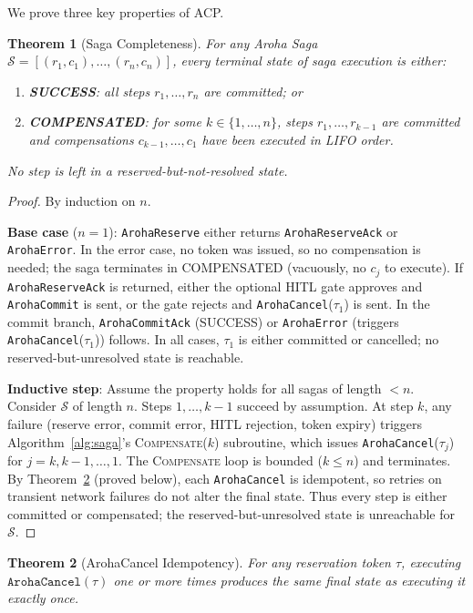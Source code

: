 \documentclass[conference]{IEEEtran}
\newtheorem{theorem}{Theorem}
\newcommand{\Saga}{\mathcal{S}}
\begin{document}
We prove three key properties of ACP.

\begin{theorem}[Saga Completeness]
\label{thm:saga}
For any Aroha Saga $\Saga = [(r_1, c_1), \ldots, (r_n, c_n)]$,
every terminal state of saga execution is either:
\begin{enumerate}
  \item \textbf{SUCCESS}: all steps $r_1, \ldots, r_n$ are committed; or
  \item \textbf{COMPENSATED}: for some $k \in \{1,\ldots,n\}$,
        steps $r_1, \ldots, r_{k-1}$ are committed and compensations
        $c_{k-1}, \ldots, c_1$ have been executed in LIFO order.
\end{enumerate}
No step is left in a \emph{reserved-but-not-resolved} state.
\end{theorem}

\begin{proof}
By induction on $n$.

\textbf{Base case} ($n = 1$): \texttt{ArohaReserve} either returns
\texttt{ArohaReserveAck} or \texttt{ArohaError}.  In the error case,
no token was issued, so no compensation is needed; the saga
terminates in COMPENSATED (vacuously, no $c_j$ to execute).
If \texttt{ArohaReserveAck} is returned, either the optional HITL
gate approves and \texttt{ArohaCommit} is sent, or the gate rejects
and \texttt{ArohaCancel}($\tau_1$) is sent.  In the commit branch,
\texttt{ArohaCommitAck} (SUCCESS) or \texttt{ArohaError}
(triggers \texttt{ArohaCancel}($\tau_1$)) follows.  In all cases,
$\tau_1$ is either committed or cancelled; no reserved-but-unresolved
state is reachable.

\textbf{Inductive step}: Assume the property holds for all sagas of
length $< n$.  Consider $\Saga$ of length $n$.  Steps $1, \ldots, k-1$
succeed by assumption.  At step $k$, any failure (reserve error, commit
error, HITL rejection, token expiry) triggers Algorithm~\ref{alg:saga}'s
\textsc{Compensate}($k$) subroutine, which issues
\texttt{ArohaCancel}($\tau_j$) for $j = k, k-1, \ldots, 1$.
The \textsc{Compensate} loop is bounded ($k \leq n$) and terminates.
By Theorem~\ref{thm:cancel} (proved below), each \texttt{ArohaCancel}
is idempotent, so retries on transient network failures do not alter
the final state.  Thus every step is either committed or compensated;
the reserved-but-unresolved state is unreachable for $\Saga$.
\end{proof}

\begin{theorem}[ArohaCancel Idempotency]
\label{thm:cancel}
For any reservation token $\tau$, executing $\texttt{ArohaCancel}(\tau)$
one or more times produces the same final state as executing it exactly
once.
\end{theorem}
\end{document}
